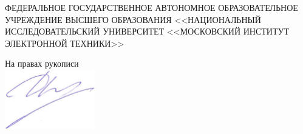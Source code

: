\thispagestyle{empty}%
\begin{center}%
\MakeUppercase{Федеральное государственное автономное образовательное учреждение высшего образования <<Национальный исследовательский университет <<Московский институт электронной техники>>}
\end{center}%
%
\vspace{0pt plus4fill} %
\begin{flushright}%
  {На правах рукописи}\\\vskip5pt
  \includegraphics[height=2.6cm]{../images/my_signature} 
\end{flushright}%
\vspace{-\baselineskip}
\vspace{-\baselineskip}

